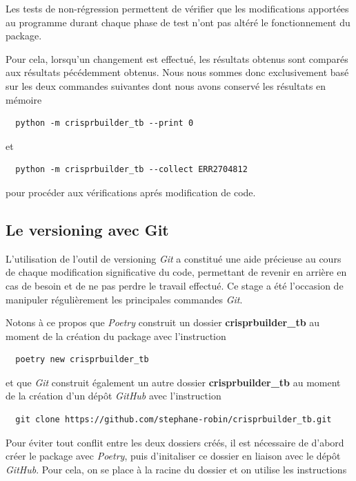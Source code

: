 \documentclass[twoside,a4paper,11pt,frenchb,openany]{report}
\begin{document}
Les tests de non-régression permettent de vérifier que les modifications apportées au programme durant chaque phase de test n'ont pas altéré le fonctionnement du package.

Pour cela, lorsqu'un changement est effectué, les résultats obtenus sont comparés aux résultats pécédemment obtenus. Nous nous sommes donc exclusivement basé sur les deux commandes suivantes dont nous avons conservé les résultats en mémoire

\begin{verbatim}  python -m crisprbuilder_tb --print 0\end{verbatim}

et 

\begin{verbatim}  python -m crisprbuilder_tb --collect ERR2704812\end{verbatim}

pour procéder aux vérifications aprés modification de code.



\subsection{Le versioning avec Git}

L'utilisation de l'outil de versioning \textit{Git} a constitué une aide précieuse au cours de chaque modification significative du code, permettant de revenir en arrière en cas de besoin et de ne pas perdre le travail effectué. Ce stage a été l'occasion de manipuler régulièrement les principales commandes \textit{Git}. 

Notons à ce propos que \textit{Poetry} construit un dossier \textbf{crisprbuilder\_tb} au moment de la création du package avec l'instruction

 \begin{verbatim}  poetry new crisprbuilder_tb\end{verbatim}

et que \textit{Git} construit également un autre dossier \textbf{crisprbuilder\_tb} au moment de la création d'un dépôt \textit{GitHub} avec l'instruction

\begin{verbatim}  git clone https://github.com/stephane-robin/crisprbuilder_tb.git\end{verbatim}

Pour éviter tout conflit entre les deux dossiers créés, il est nécessaire de d'abord créer le package avec \textit{Poetry}, puis d'initaliser ce dossier en liaison avec le dépôt \textit{GitHub}. Pour cela, on se place à la racine du dossier et on utilise les instructions
\end{document}
